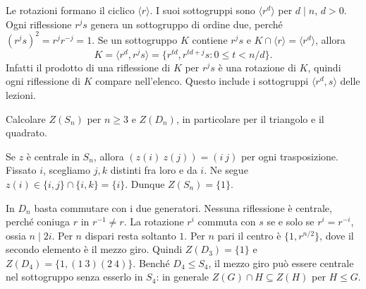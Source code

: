 \begin{osservazione}
Le rotazioni formano il ciclico $\langle r\rangle$. I suoi sottogruppi sono $\langle r^d\rangle$ per $d\mid n$, $d>0$. Ogni riflessione $r^js$ genera un sottogruppo di ordine due, perché $(r^js)^2=r^jr^{-j}=1$. Se un sottogruppo $K$ contiene $r^js$ e $K\cap\langle r\rangle=\langle r^d\rangle$, allora
\[
 K=\langle r^d,r^js\rangle
 =\{r^{td},r^{td+j}s:0\le t<n/d\}.
\]
Infatti il prodotto di una riflessione di $K$ per $r^js$ è una rotazione di $K$, quindi ogni riflessione di $K$ compare nell'elenco. Questo include i sottogruppi $\langle r^d,s\rangle$ delle lezioni.
\end{osservazione}
\begin{esercizio}
Calcolare $Z(S_n)$ per $n\ge3$ e $Z(D_n)$, in particolare per il triangolo e il quadrato.
\end{esercizio}
\begin{svolgimento}
Se $z$ è centrale in $S_n$, allora $(z(i)\ z(j))=(i\ j)$ per ogni trasposizione. Fissato $i$, scegliamo $j,k$ distinti fra loro e da $i$. Ne segue $z(i)\in\{i,j\}\cap\{i,k\}=\{i\}$. Dunque $Z(S_n)=\{1\}$.

In $D_n$ basta commutare con i due generatori. Nessuna riflessione è centrale, perché coniuga $r$ in $r^{-1}\ne r$. La rotazione $r^i$ commuta con $s$ se e solo se $r^i=r^{-i}$, ossia $n\mid 2i$. Per $n$ dispari resta soltanto $1$. Per $n$ pari il centro è $\{1,r^{n/2}\}$, dove il secondo elemento è il mezzo giro. Quindi $Z(D_3)=\{1\}$ e $Z(D_4)=\{1,(1\ 3)(2\ 4)\}$. Benché $D_4\le S_4$, il mezzo giro può essere centrale nel sottogruppo senza esserlo in $S_4$: in generale $Z(G)\cap H\subseteq Z(H)$ per $H\le G$.
\end{svolgimento}

